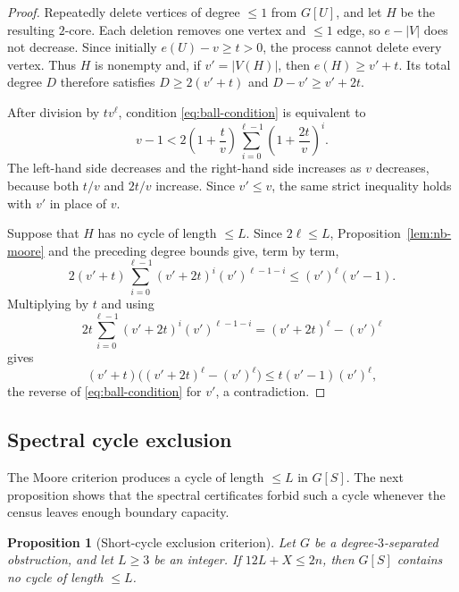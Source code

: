 \documentclass[11pt]{article}
\numberwithin{equation}{section}
\newtheorem{proposition}[theorem]{Proposition}
\theoremstyle{definition}
\theoremstyle{remark}
\begin{document}
\begin{proof}
Repeatedly delete vertices of degree \(\le1\) from \(G[U]\), and let
\(H\) be the resulting \(2\)-core.  Each deletion removes one vertex and
\(\le1\) edge, so \(e-|V|\) does not decrease.  Since initially
\(e(U)-v\ge t>0\), the process cannot delete every vertex.  Thus \(H\) is
nonempty and, if \(v'=|V(H)|\), then \(e(H)\ge v'+t\).  Its total degree
\(D\) therefore satisfies \(D\ge2(v'+t)\) and \(D-v'\ge v'+2t\).

After division by \(tv^\ell\), condition \eqref{eq:ball-condition} is
equivalent to
\[
 v-1<2\left(1+\frac tv\right)
 \sum_{i=0}^{\ell-1}\left(1+\frac{2t}{v}\right)^i.
\]
The left-hand side decreases and the right-hand side increases as \(v\)
decreases, because both \(t/v\) and \(2t/v\) increase.  Since \(v'\le v\),
the same strict inequality holds with \(v'\) in place of \(v\).

Suppose that \(H\) has no cycle of length \(\le L\).  Since
\(2\ell\le L\), Proposition~\ref{lem:nb-moore} and the preceding degree
bounds give, term by term,
\[
 2(v'+t)\sum_{i=0}^{\ell-1}(v'+2t)^i(v')^{\ell-1-i}
 \le (v')^\ell(v'-1).
\]
Multiplying by \(t\) and using
\[
 2t\sum_{i=0}^{\ell-1}(v'+2t)^i(v')^{\ell-1-i}
 = (v'+2t)^\ell-(v')^\ell
\]
gives
\[
 (v'+t)\bigl((v'+2t)^\ell-(v')^\ell\bigr)
 \le t(v'-1)(v')^\ell,
\]
the reverse of \eqref{eq:ball-condition} for \(v'\), a contradiction.
\end{proof}

\subsection{Spectral cycle exclusion}

The Moore criterion produces a cycle of length \(\le L\) in \(G[S]\).  The
next proposition shows that the spectral certificates forbid such a cycle
whenever the census leaves enough boundary capacity.

\begin{proposition}[Short-cycle exclusion criterion]
\label{lem:cycle-exclusion}
Let \(G\) be a degree-\(3\)-separated obstruction, and let \(L\ge3\) be an
integer.  If \(12L+X\le2n\), then \(G[S]\) contains no cycle of length
\(\le L\).
\end{proposition}
\end{document}
